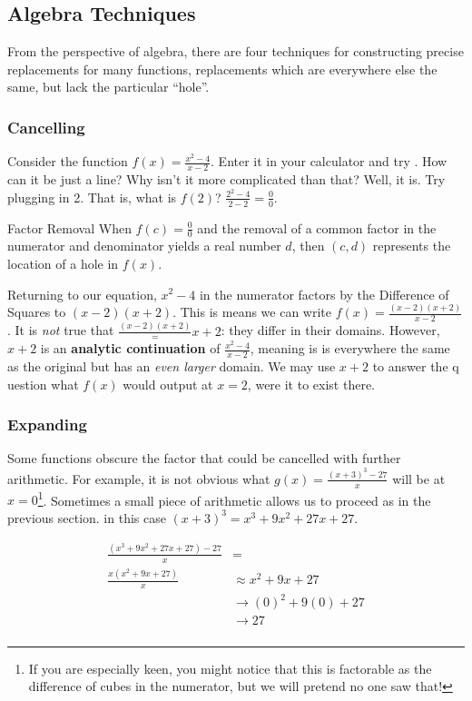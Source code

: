 \subsection{Algebra Techniques}
From the perspective of algebra, there are four techniques for constructing 
precise replacements for many functions, replacements which are everywhere else the same,
but lack the particular ``hole''.

\subsubsection{Cancelling}
Consider the function $f(x) = \frac{x^2-4}{x-2}$.    Enter it in your calculator and try \Touche[style=function,principal={ZOOM},]
\Touche[style=number, principal=6].  How can it be just a line?  Why isn't it more complicated than that?  
Well, it is.  Try plugging in 2.  That is, what is $f(2)$?  $\frac{2^2-4}{2-2} = \frac{0}{0}$.


\begin{derivation}{Factor Removal}
When $f(c)=\frac{0}{0}$ and the removal of a common factor in the numerator and denominator yields a real number $d$,
then $(c,d)$ represents the location of a hole in $f(x)$.
\end{derivation}


Returning to our equation, $x^2-4$ in the numerator factors by the 
Difference of Squares to $(x-2)(x+2)$.  This is means
we can write $f(x)=\frac{(x-2)(x+2)}{x-2}$.  It is \emph{not} true that 
$\frac{(x-2)(x+2)} = x+2$: they differ in their domains.
However, $x+2$ is an \textbf{analytic continuation} of $\frac{x^2-4}{x-2}$, 
meaning is is everywhere the same as the
original but has an \textit{even larger} domain.  We may use $x+2$ to answer the q
uestion what $f(x)$ would output
at $x=2$, were it to exist there.

\subsubsection{Expanding}
Some functions obscure the factor that could be cancelled with further arithmetic.  For example, it is not obvious
what $g(x)=\frac{(x+3)^3-27}{x}$ will be at $x=0$\footnote{If you are especially keen, you might notice that this is
factorable as the difference of cubes in the numerator, but we will pretend no one saw that!}.  Sometimes a small
piece of arithmetic allows us to proceed as in the previous section.  in this case $(x+3)^3=x^3+9x^2+27x+27$.


\begin{align*}
\frac{(x^3+9x^2+27x+27)-27}{x} &=\\
\frac{x(x^2+9x+27)}{x} & \approx x^2+9x+27\\
& \rightarrow (0)^2+9(0)+27 \\
&\rightarrow 27\\
\end{align*}


